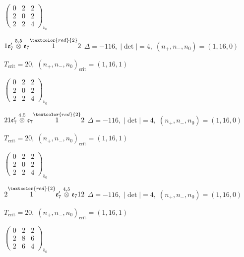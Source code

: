 \documentclass[10pt]{article}
\begin{document}
\hspace{2em}$\left(\begin{smallmatrix}0 & 2 & 2 \\ 2 & 0 & 2 \\ 2 & 2 & 4\end{smallmatrix}\right)_{\!b_0}$

\smallskip

$1\mathfrak{e}_7'\overset{5,5}{\otimes}\mathfrak{e}_7\overset{\textcolor{red}{2}}{1}2$ \quad $\Delta=-116,\; |\det|=4,\; (n_+,n_-,n_0)=(1,16,0)$

\hspace{1em}$T_{\text{crit}}=20,\; (n_+,n_-,n_0)_{\text{crit}}=(1,16,1)$

\hspace{2em}$\left(\begin{smallmatrix}0 & 2 & 2 \\ 2 & 0 & 2 \\ 2 & 2 & 4\end{smallmatrix}\right)_{\!b_0}$

\smallskip

$21\mathfrak{e}_7'\overset{4,5}{\otimes}\mathfrak{e}_7\overset{\textcolor{red}{2}}{1}2$ \quad $\Delta=-116,\; |\det|=4,\; (n_+,n_-,n_0)=(1,16,0)$

\hspace{1em}$T_{\text{crit}}=20,\; (n_+,n_-,n_0)_{\text{crit}}=(1,16,1)$

\hspace{2em}$\left(\begin{smallmatrix}0 & 2 & 2 \\ 2 & 0 & 2 \\ 2 & 2 & 4\end{smallmatrix}\right)_{\!b_0}$

$2\overset{\textcolor{red}{2}}{1}\mathfrak{e}_7'\overset{4,5}{\otimes}\mathfrak{e}_712$ \quad $\Delta=-116,\; |\det|=4,\; (n_+,n_-,n_0)=(1,16,0)$

\hspace{1em}$T_{\text{crit}}=20,\; (n_+,n_-,n_0)_{\text{crit}}=(1,16,1)$

\hspace{2em}$\left(\begin{smallmatrix}0 & 2 & 2 \\ 2 & 8 & 6 \\ 2 & 6 & 4\end{smallmatrix}\right)_{\!b_0}$
\end{document}
